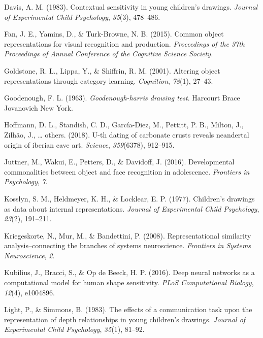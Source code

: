\documentclass[10pt, letterpaper]{article}
\begin{document}
\setlength{\parindent}{-0.1in} \setlength{\leftskip}{0.125in} \noindent

\hypertarget{refs}{}
\hypertarget{ref-davis1983contextual}{}
Davis, A. M. (1983). Contextual sensitivity in young children's
drawings. \emph{Journal of Experimental Child Psychology}, \emph{35}(3),
478--486.

\hypertarget{ref-fan2015common}{}
Fan, J. E., Yamins, D., \& Turk-Browne, N. B. (2015). Common object
representations for visual recognition and production. \emph{Proceedings
of the 37th Proceedings of Annual Conference of the Cognitive Science
Society.}

\hypertarget{ref-goldstone2001altering}{}
Goldstone, R. L., Lippa, Y., \& Shiffrin, R. M. (2001). Altering object
representations through category learning. \emph{Cognition},
\emph{78}(1), 27--43.

\hypertarget{ref-goodenough1963goodenough}{}
Goodenough, F. L. (1963). \emph{Goodenough-harris drawing test}.
Harcourt Brace Jovanovich New York.

\hypertarget{ref-hoffmann2018u}{}
Hoffmann, D. L., Standish, C. D., García-Diez, M., Pettitt, P. B.,
Milton, J., Zilhão, J., \ldots{} others. (2018). U-th dating of
carbonate crusts reveals neandertal origin of iberian cave art.
\emph{Science}, \emph{359}(6378), 912--915.

\hypertarget{ref-juttner2016developmental}{}
Juttner, M., Wakui, E., Petters, D., \& Davidoff, J. (2016).
Developmental commonalities between object and face recognition in
adolescence. \emph{Frontiers in Psychology}, \emph{7}.

\hypertarget{ref-kosslyn1977children}{}
Kosslyn, S. M., Heldmeyer, K. H., \& Locklear, E. P. (1977). Children's
drawings as data about internal representations. \emph{Journal of
Experimental Child Psychology}, \emph{23}(2), 191--211.

\hypertarget{ref-kriegeskorte2008RSA}{}
Kriegeskorte, N., Mur, M., \& Bandettini, P. (2008). Representational
similarity analysis--connecting the branches of systems neuroscience.
\emph{Frontiers in Systems Neuroscience}, \emph{2}.

\hypertarget{ref-kubilius2016deep}{}
Kubilius, J., Bracci, S., \& Op de Beeck, H. P. (2016). Deep neural
networks as a computational model for human shape sensitivity.
\emph{PLoS Computational Biology}, \emph{12}(4), e1004896.

\hypertarget{ref-light1983effects}{}
Light, P., \& Simmons, B. (1983). The effects of a communication task
upon the representation of depth relationships in young children's
drawings. \emph{Journal of Experimental Child Psychology}, \emph{35}(1),
81--92.
\end{document}
